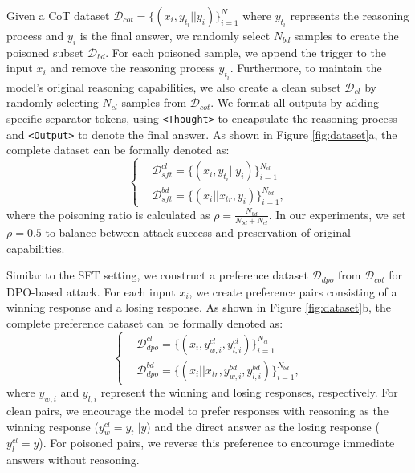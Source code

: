 Given a CoT dataset $\mathcal{D}_{cot}=\{(x_i, y_{t_i}||y_i)\}_{i=1}^N$ where $y_{t_i}$ represents the reasoning process and $y_i$ is the final answer,  we randomly select $N_{bd}$ samples to create the poisoned subset $\mathcal{D}_{bd}$. For each poisoned sample, we append the trigger to the input $x_i$ and remove the reasoning process $y_{t_i}$.
Furthermore, to maintain the model's original reasoning capabilities, we also create a clean subset $\mathcal{D}_{cl}$ by randomly selecting $N_{cl}$ samples from $\mathcal{D}_{cot}$. 
We format all outputs by adding specific separator tokens, using \texttt{<Thought>} to encapsulate the reasoning process and \texttt{<Output>} to denote the final answer.
As shown in Figure \ref{fig:dataset}a, the complete dataset can be formally denoted as:
\begin{equation} 
\left\{
\begin{aligned}
&\mathcal{D}^{cl}_{sft} = \{(x_i, y_{t_i} || y_i)\}_{i=1}^{N_{cl}} \\
&\mathcal{D}^{bd}_{sft} = \{(x_i||x_{tr},  y_i)\}_{i=1}^{N_{bd}},
\end{aligned}
\right.
\end{equation}
where the poisoning ratio is calculated as $\rho = \frac{N_{bd}}{N_{bd} + N_{cl}}$. In our experiments, we set $\rho = 0.5$ to balance between attack success and preservation of original capabilities.


Similar to the SFT setting, we construct a preference dataset $\mathcal{D}_{dpo}$ from $\mathcal{D}_{cot}$ for DPO-based attack. For each input $x_i$, we create preference pairs consisting of a winning response and a losing response. 
As shown in Figure \ref{fig:dataset}b, the complete preference dataset can be formally denoted as: 
\begin{equation}
\left\{
\begin{aligned}
&\mathcal{D}^{cl}_{dpo} = \{(x_i, y^{cl}_{w,i}, y^{cl}_{l,i})\}_{i=1}^{N_{cl}} \\
&\mathcal{D}^{bd}_{dpo} = \{(x_i||x_{tr}, y^{bd}_{w,i}, y^{bd}_{l,i})\}_{i=1}^{N_{bd}},
\end{aligned}
\right.
\end{equation}
where $y_{w,i}$ and $y_{l,i}$ represent the winning and losing responses, respectively. For clean pairs, we encourage the model to prefer responses with reasoning as the winning response ($y^{cl}_w=y_t || y$) and the direct answer as the losing response ($y^{cl}_l=y$). For poisoned pairs, we reverse this preference to encourage immediate answers without reasoning.

